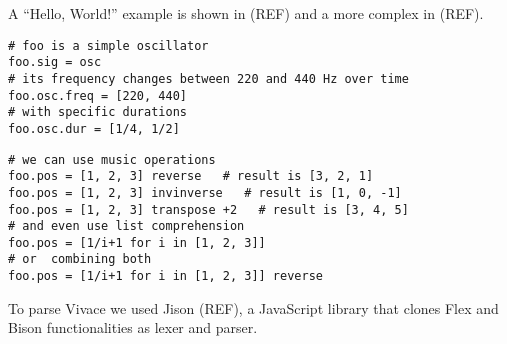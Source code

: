 \documentclass[letterpaper, 12pt]{article}
\begin{document}
A ``Hello, World!'' example is shown in (REF) and a more complex in (REF).

\begin{Verbatim}[fontfamily=courier, xleftmargin=\parindent]
# foo is a simple oscillator
foo.sig = osc
# its frequency changes between 220 and 440 Hz over time
foo.osc.freq = [220, 440]
# with specific durations
foo.osc.dur = [1/4, 1/2]
\end{Verbatim}

\begin{Verbatim}[fontfamily=courier, xleftmargin=\parindent]
# we can use music operations
foo.pos = [1, 2, 3] reverse   # result is [3, 2, 1]
foo.pos = [1, 2, 3] invinverse   # result is [1, 0, -1]
foo.pos = [1, 2, 3] transpose +2   # result is [3, 4, 5]
# and even use list comprehension
foo.pos = [1/i+1 for i in [1, 2, 3]]
# or  combining both
foo.pos = [1/i+1 for i in [1, 2, 3]] reverse
\end{Verbatim}

To parse Vivace we used Jison (REF), a JavaScript library that clones Flex and Bison functionalities as lexer and parser.
\end{document}
